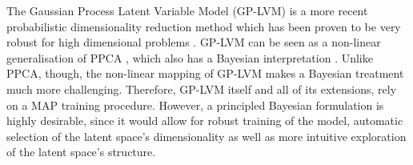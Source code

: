 \documentclass [10pt , a4paper]{article}
\begin{document}





\par The Gaussian Process Latent Variable Model (GP-LVM) \cite{GPLVM} is a more recent probabilistic dimensionality 
reduction method which has been proven to be very robust for high dimensional problems 
\cite{gplvmLarger, Damianou:vgpds11}. GP-LVM can be seen 
as a non-linear generalisation of PPCA \cite{Tipping:probpca99}, which also has a Bayesian interpretation \cite{Bishop:bayesPCA98}. 
Unlike PPCA, though, the non-linear mapping of GP-LVM makes a Bayesian
treatment much more challenging.
Therefore, GP-LVM itself and all of its extensions, rely on a MAP training procedure.
 However, a principled Bayesian formulation is highly desirable, since it would allow for robust training of the model,
 automatic selection of the latent space's dimensionality as well as more intuitive exploration of the latent space's 
structure.
\end{document}
